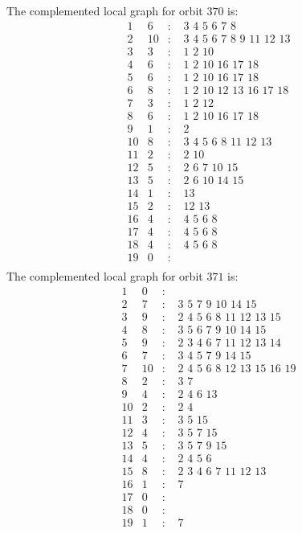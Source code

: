 \documentclass[12pt]{article}
\begin{document}
The complemented local graph for orbit $370$ is:
\begin{equation*}
\begin{array}{rrcl}
1&6&:&\,\,3\,\,4\,\,5\,\,6\,\,7\,\,8\\
2&10&:&\,\,3\,\,4\,\,5\,\,6\,\,7\,\,8\,\,9\,\,11\,\,12\,\,13\\
3&3&:&\,\,1\,\,2\,\,10\\
4&6&:&\,\,1\,\,2\,\,10\,\,16\,\,17\,\,18\\
5&6&:&\,\,1\,\,2\,\,10\,\,16\,\,17\,\,18\\
6&8&:&\,\,1\,\,2\,\,10\,\,12\,\,13\,\,16\,\,17\,\,18\\
7&3&:&\,\,1\,\,2\,\,12\\
8&6&:&\,\,1\,\,2\,\,10\,\,16\,\,17\,\,18\\
9&1&:&\,\,2\\
10&8&:&\,\,3\,\,4\,\,5\,\,6\,\,8\,\,11\,\,12\,\,13\\
11&2&:&\,\,2\,\,10\\
12&5&:&\,\,2\,\,6\,\,7\,\,10\,\,15\\
13&5&:&\,\,2\,\,6\,\,10\,\,14\,\,15\\
14&1&:&\,\,13\\
15&2&:&\,\,12\,\,13\\
16&4&:&\,\,4\,\,5\,\,6\,\,8\\
17&4&:&\,\,4\,\,5\,\,6\,\,8\\
18&4&:&\,\,4\,\,5\,\,6\,\,8\\
19&0&:&\\
\end{array}
\end{equation*}
The complemented local graph for orbit $371$ is:
\begin{equation*}
\begin{array}{rrcl}
1&0&:&\\
2&7&:&\,\,3\,\,5\,\,7\,\,9\,\,10\,\,14\,\,15\\
3&9&:&\,\,2\,\,4\,\,5\,\,6\,\,8\,\,11\,\,12\,\,13\,\,15\\
4&8&:&\,\,3\,\,5\,\,6\,\,7\,\,9\,\,10\,\,14\,\,15\\
5&9&:&\,\,2\,\,3\,\,4\,\,6\,\,7\,\,11\,\,12\,\,13\,\,14\\
6&7&:&\,\,3\,\,4\,\,5\,\,7\,\,9\,\,14\,\,15\\
7&10&:&\,\,2\,\,4\,\,5\,\,6\,\,8\,\,12\,\,13\,\,15\,\,16\,\,19\\
8&2&:&\,\,3\,\,7\\
9&4&:&\,\,2\,\,4\,\,6\,\,13\\
10&2&:&\,\,2\,\,4\\
11&3&:&\,\,3\,\,5\,\,15\\
12&4&:&\,\,3\,\,5\,\,7\,\,15\\
13&5&:&\,\,3\,\,5\,\,7\,\,9\,\,15\\
14&4&:&\,\,2\,\,4\,\,5\,\,6\\
15&8&:&\,\,2\,\,3\,\,4\,\,6\,\,7\,\,11\,\,12\,\,13\\
16&1&:&\,\,7\\
17&0&:&\\
18&0&:&\\
19&1&:&\,\,7\\
\end{array}
\end{equation*}
\end{document}
